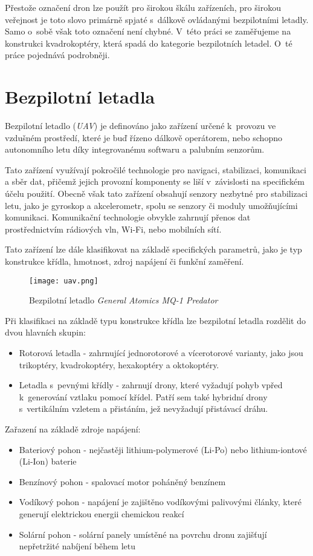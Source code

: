 \documentclass[12pt]{report}
\begin{document}
Přestože označení dron lze použít pro širokou škálu zařízeních, pro širokou veřejnost je toto slovo primárně spjaté s~dálkově ovládanými bezpilotními letadly. Samo o~sobě však toto označení není chybné. V~této práci se zaměřujeme na konstrukci kvadrokoptéry, která spadá do kategorie bezpilotních letadel. O~té práce pojednává podrobněji. \cite{mainbook}

\section[Bezpilotní letadla]{Bezpilotní letadla}
Bezpilotní letadlo (\textit{UAV}) je definováno jako zařízení určené k~provozu ve vzdušném prostředí, které je buď řízeno dálkově operátorem, nebo schopno autonomního letu díky integrovanému softwaru a palubním senzorům.

Tato zařízení využívají pokročilé technologie pro navigaci, stabilizaci, komunikaci a sběr dat, přičemž jejich provozní komponenty se liší v~závislosti na specifickém účelu použití. Obecně však tato zařízení obsahují senzory nezbytné pro stabilizaci letu, jako je gyroskop a akcelerometr, spolu se senzory či moduly umožňujícími komunikaci. Komunikační technologie obvykle zahrnují přenos dat prostřednictvím rádiových vln, Wi-Fi, nebo mobilních sítí.

Tato zařízení lze dále klasifikovat na základě specifických parametrů, jako je typ konstrukce křídla, hmotnost, zdroj napájení či funkční zaměření.

\begin{figure}[H]
	\centering
	\texttt{[image: uav.png]}
	\caption{Bezpilotní letadlo \textit{General Atomics MQ-1 Predator} \cite{mainbook}}
	\label{fig:uav.png}
  \end{figure}

Při klasifikaci na základě typu konstrukce křídla lze bezpilotní letadla rozdělit do dvou hlavních skupin:
\begin{itemize}
	\item Rotorová letadla - zahrnující jednorotorové a vícerotorové varianty, jako jsou trikoptéry, kvadrokoptéry, hexakoptéry a oktokoptéry.
	\item Letadla s~pevnými křídly - zahrnují drony, které vyžadují pohyb vpřed k~generování vztlaku pomocí křídel. Patří sem také hybridní drony s~vertikálním vzletem a přistáním, jež nevyžadují přistávací dráhu.
\end{itemize}

Zařazení na základě zdroje napájení:
\begin{itemize}
	\item Bateriový pohon - nejčastěji lithium-polymerové (Li-Po) nebo lithium-iontové (Li-Ion) baterie
	\item Benzínový pohon - spalovací motor poháněný benzínem
	\item Vodíkový pohon - napájení je zajištěno vodíkovými palivovými články, které generují elektrickou energii chemickou reakcí
	\item Solární pohon - solární panely umístěné na povrchu dronu zajišťují nepřetržité nabíjení během letu
\end{itemize}
\end{document}
